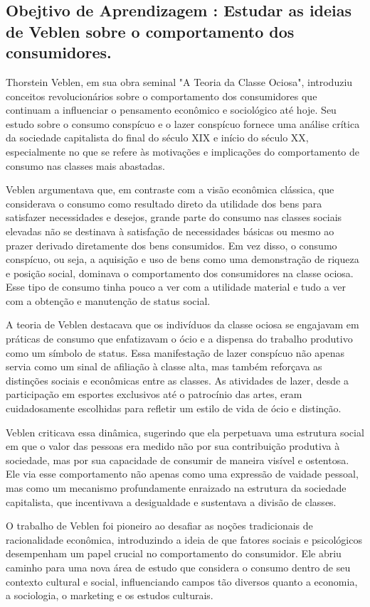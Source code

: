 \documentclass[a4paper,12pt]{article}[abntex2]
\begin{document}
\subsection{\textbf{Obejtivo de Aprendizagem : Estudar as ideias de Veblen sobre o comportamento dos consumidores.}}
Thorstein Veblen, em sua obra seminal "A Teoria da Classe Ociosa", introduziu conceitos revolucionários sobre o comportamento dos consumidores que continuam a influenciar o pensamento econômico e sociológico até hoje. Seu estudo sobre o consumo conspícuo e o lazer conspícuo fornece uma análise crítica da sociedade capitalista do final do século XIX e início do século XX, especialmente no que se refere às motivações e implicações do comportamento de consumo nas classes mais abastadas.

Veblen argumentava que, em contraste com a visão econômica clássica, que considerava o consumo como resultado direto da utilidade dos bens para satisfazer necessidades e desejos, grande parte do consumo nas classes sociais elevadas não se destinava à satisfação de necessidades básicas ou mesmo ao prazer derivado diretamente dos bens consumidos. Em vez disso, o consumo conspícuo, ou seja, a aquisição e uso de bens como uma demonstração de riqueza e posição social, dominava o comportamento dos consumidores na classe ociosa. Esse tipo de consumo tinha pouco a ver com a utilidade material e tudo a ver com a obtenção e manutenção de status social.

A teoria de Veblen destacava que os indivíduos da classe ociosa se engajavam em práticas de consumo que enfatizavam o ócio e a dispensa do trabalho produtivo como um símbolo de status. Essa manifestação de lazer conspícuo não apenas servia como um sinal de afiliação à classe alta, mas também reforçava as distinções sociais e econômicas entre as classes. As atividades de lazer, desde a participação em esportes exclusivos até o patrocínio das artes, eram cuidadosamente escolhidas para refletir um estilo de vida de ócio e distinção.

Veblen criticava essa dinâmica, sugerindo que ela perpetuava uma estrutura social em que o valor das pessoas era medido não por sua contribuição produtiva à sociedade, mas por sua capacidade de consumir de maneira visível e ostentosa. Ele via esse comportamento não apenas como uma expressão de vaidade pessoal, mas como um mecanismo profundamente enraizado na estrutura da sociedade capitalista, que incentivava a desigualdade e sustentava a divisão de classes.

O trabalho de Veblen foi pioneiro ao desafiar as noções tradicionais de racionalidade econômica, introduzindo a ideia de que fatores sociais e psicológicos desempenham um papel crucial no comportamento do consumidor. Ele abriu caminho para uma nova área de estudo que considera o consumo dentro de seu contexto cultural e social, influenciando campos tão diversos quanto a economia, a sociologia, o marketing e os estudos culturais.
\end{document}

